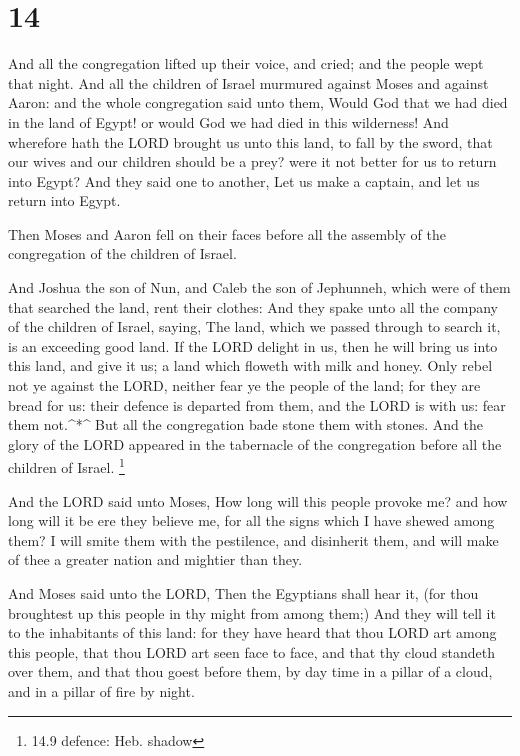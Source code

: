 \hypertarget{section-13}{%
\section{14}\label{section-13}}

 And all the congregation lifted up their voice, and cried;
and the people wept that night.  And all the children of
Israel murmured against Moses and against Aaron: and the whole
congregation said unto them, Would God that we had died in the land of
Egypt! or would God we had died in this wilderness!  And
wherefore hath the LORD brought us unto this land, to fall by the sword,
that our wives and our children should be a prey? were it not better for
us to return into Egypt?  And they said one to another, Let
us make a captain, and let us return into Egypt.

 Then Moses and Aaron fell on their faces before all the
assembly of the congregation of the children of Israel.

 And Joshua the son of Nun, and Caleb the son of Jephunneh,
which were of them that searched the land, rent their clothes:
 And they spake unto all the company of the children of
Israel, saying, The land, which we passed through to search it, is an
exceeding good land.  If the LORD delight in us, then he
will bring us into this land, and give it us; a land which floweth with
milk and honey.  Only rebel not ye against the LORD, neither
fear ye the people of the land; for they are bread for us: their defence
is departed from them, and the LORD is with us: fear them not.\^{}*\^{}
 But all the congregation bade stone them with stones. And
the glory of the LORD appeared in the tabernacle of the congregation
before all the children of Israel. \footnote{14.9 defence: Heb. shadow}

 And the LORD said unto Moses, How long will this people
provoke me? and how long will it be ere they believe me, for all the
signs which I have shewed among them?  I will smite them
with the pestilence, and disinherit them, and will make of thee a
greater nation and mightier than they.

 And Moses said unto the LORD, Then the Egyptians shall
hear it, (for thou broughtest up this people in thy might from among
them;)  And they will tell it to the inhabitants of this
land: for they have heard that thou LORD art among this people, that
thou LORD art seen face to face, and that thy cloud standeth over them,
and that thou goest before them, by day time in a pillar of a cloud, and
in a pillar of fire by night.

